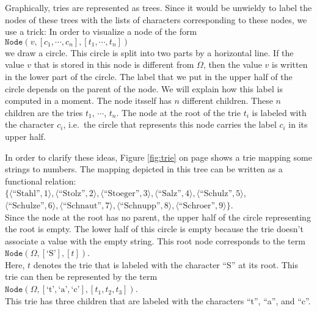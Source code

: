 Graphically, tries are represented as trees.  Since it would be unwieldy to label the nodes of these
trees with the lists of characters corresponding to these nodes, we use a trick:  In order to
visualize a node of the form \\[0.2cm]
\hspace*{1.3cm} 
$\texttt{Node}(v, [c_1, \cdots, c_n], [t_1, \cdots, t_n])$ \\[0.2cm]
we draw a circle.  This circle is split into two parts by a horizontal line.
If the value  $v$ that is stored in this node is different from $\Omega$, then the value $v$ is
written in the lower part of the circle.  The label that we put in the upper half of the circle
depends on the parent of the node.  We will explain how this label is computed in a moment.
The node itsself has $n$ different children.  These $n$ children are the tries
$t_1$, $\cdots$, $t_n$.  The node at the root of the trie $t_i$ is labeled with the character $c_i$,
i.e.~the circle that represents this node carries the label $c_i$ in its upper half.

In order to clarify these ideas, Figure  \ref{fig:trie} on page \pageref{fig:trie} shows a trie
mapping some strings to numbers.  The mapping depicted in this tree can be written as a functional
relation: 
\\[0.2cm]
\hspace*{1.3cm} $ \bigl\{ \langle \textrm{``Stahl''},   1  \rangle, \langle \textrm{``Stolz''},     2  \rangle, \langle \textrm{``Stoeger''},   3  \rangle, 
             \langle \textrm{``Salz''},      4  \rangle, \langle \textrm{``Schulz''},    5  \rangle$, \\[0.2cm]
\hspace*{1.5cm} $\langle \textrm{``Schulze''},   6  \rangle, \langle \textrm{``Schnaut''},   7  \rangle, 
  \langle \textrm{``Schnupp''},   8  \rangle, 
  \langle \textrm{``Schroer''},   9  \rangle\}$. \\[0.2cm]
Since the node at the root has no parent, the upper half of  the circle representing the root is
empty.  The lower half of  this circle is empty because the trie doesn't associate a value with the
empty string.  This root node corresponds to the term 
\\[0.2cm]
\hspace*{1.3cm}
 $\texttt{Node}(\Omega,[\textrm{`S'}], [t])$. 
\\[0.2cm]
Here,  $t$ denotes the trie that is labeled with the character  ``S'' at its root.
This trie can then be represented by the term  \\[0.2cm]
\hspace*{1.3cm} 
$\texttt{Node}(\Omega,[\textrm{`t'},\textrm{`a'},\textrm{`c'}], [t_1, t_2, t_3])$. \\[0.2cm]
This trie has three children that are labeled with the characters  ``t'', ``a'', and ``c''.

